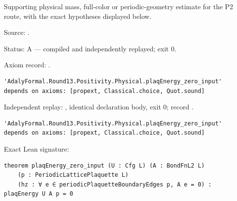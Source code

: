 \begin{theorem}[bp-475]
\label{bp-475}
\leanok
Supporting physical mass, full-color or periodic-geometry estimate for the P2 route, with the exact hypotheses displayed below.

\par Source: \texttt{}.
\par Status: A — compiled and independently replayed; exit 0.
\par Axiom record: \texttt{}.
\begin{verbatim}
'AdalyFormal.Round13.Positivity.Physical.plaqEnergy_zero_input' depends on axioms: [propext, Classical.choice, Quot.sound]
\end{verbatim}
\par Independent replay: \texttt{}, identical declaration body, exit 0; record \texttt{}.
\begin{verbatim}
'AdalyFormal.Round13.Positivity.Physical.plaqEnergy_zero_input' depends on axioms: [propext, Classical.choice, Quot.sound]
\end{verbatim}
\par Exact Lean signature:
\begin{verbatim}
theorem plaqEnergy_zero_input (U : Cfg L) (A : BondFnL2 L)
    (p : PeriodicLatticePlaquette L)
    (hz : ∀ e ∈ periodicPlaquetteBoundaryEdges p, A e = 0) : plaqEnergy U A p = 0
\end{verbatim}
\end{theorem}

